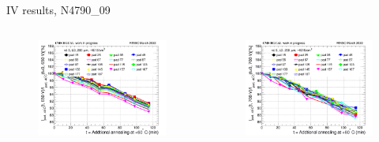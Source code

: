 \documentclass{beamer}
\begin{document}
\begin{frame}{IV results, N4790\_09 }
  \begin{columns}
       \begin{figure}
           \includegraphics[width=1.0\textwidth]{plots/8in_198ch_2019_N4790_21_4E15_neg40degC_annealing_current_650.png}
       \end{figure}
       \begin{figure}
           \includegraphics[width=1.0\textwidth]{plots/8in_198ch_2019_N4790_21_4E15_neg40degC_annealing_current_700.png}
       \end{figure}
   \end{columns}
\end{frame}
\end{document}
